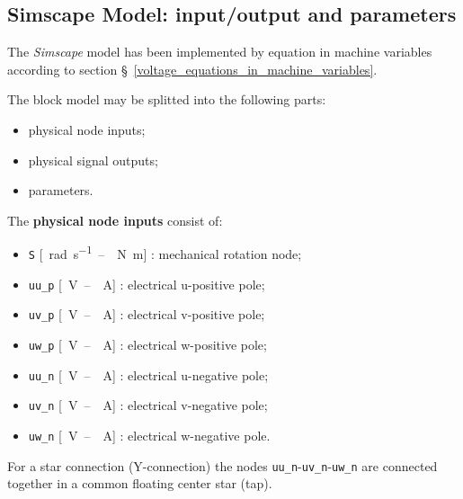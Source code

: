 \documentclass[12pt,a4paper]{scrartcl}
\begin{document}
\begin{onehalfspace}
\appendix

\section{Simscape Model: input/output and parameters}
The \textit{Simscape} model has been implemented by equation in machine variables according to section §~\ref{voltage_equations_in_machine_variables}.

The block model may be splitted into the following parts:
\begin{itemize}
	\item[--] physical node inputs;
	\item[--] physical signal outputs;
	\item[--] parameters.
\end{itemize} 

\noindent The \textbf{physical node inputs} consist of: 
\begin{itemize}
	\item[--] \texttt{S} [\SI{}{\radian\per\second}~--~\SI{}{\newton\meter}] : mechanical rotation node;
	\item[--] \texttt{uu\_p} [\SI{}{\volt}~--~\SI{}{\ampere}] : electrical u-positive pole;
	\item[--] \texttt{uv\_p} [\SI{}{\volt}~--~\SI{}{\ampere}] : electrical v-positive pole;
	\item[--] \texttt{uw\_p} [\SI{}{\volt}~--~\SI{}{\ampere}] : electrical w-positive pole;
	\item[--] \texttt{uu\_n} [\SI{}{\volt}~--~\SI{}{\ampere}] : electrical u-negative pole;
	\item[--] \texttt{uv\_n} [\SI{}{\volt}~--~\SI{}{\ampere}] : electrical v-negative pole;
	\item[--] \texttt{uw\_n} [\SI{}{\volt}~--~\SI{}{\ampere}] : electrical w-negative pole.
\end{itemize} 
For a star connection (Y-connection) the nodes \texttt{uu\_n}-\texttt{uv\_n}-\texttt{uw\_n} are connected together in a common floating center star (tap).


\end{onehalfspace}
\end{document}
